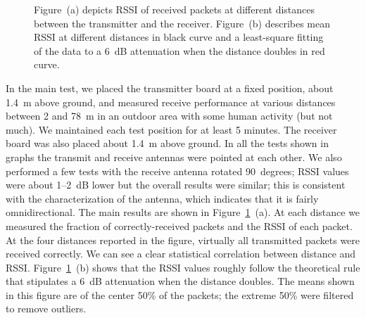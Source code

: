 
\begin{figure}[h]
    \centering
    \hspace{0.01in}
    \caption{Figure~(a) depicts RSSI of received packets at different distances between 
    the transmitter and the receiver. Figure~(b) describes mean RSSI at 
    different distances in black curve and a least-square
    fitting of the data to a 6~dB attenuation when the distance doubles in red curve.}
    \label{fig:rssi}
\end{figure}

In the main test, we placed the transmitter board at a fixed position, about 1.4~m above ground, and measured receive
performance at various distances between 2 and 78~m in an outdoor area with some human activity (but not much). We 
maintained each test position for at least 5 minutes.
The receiver board was also placed about 1.4~m above ground. In all the tests shown in graphs the transmit
and receive antennas were pointed at each other. We also performed a few tests with the receive antenna rotated 90~degrees;
RSSI values were about 1--2~dB lower but the overall results were similar; this is consistent with the characterization
of the antenna, which indicates that it is fairly omnidirectional.
The main results are shown in Figure~\ref{fig:rssi}~(a).
At each distance we measured the fraction of correctly-received packets and the RSSI of each packet. At the four
distances reported in the figure, virtually all transmitted packets were received correctly. We can see a clear
statistical correlation between distance and RSSI. Figure~\ref{fig:rssi}~(b) shows that the RSSI values
roughly follow the theoretical rule that stipulates a 6~dB attenuation when the distance doubles. The means
shown in this figure are of the center 50\% of the packets; the extreme 50\% were filtered to remove outliers.

